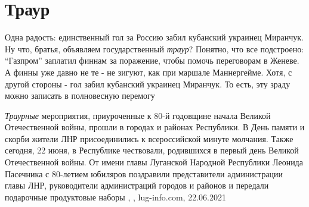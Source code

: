  
 
 
 
 
\chapter{Траур}
\label{sec:slova.traur}

Одна радость: единственный гол за Россию забил кубанский украинец Миранчук.  Ну
что, братья, объявляем государственный \emph{траур}?  Понятно, что все
подстроено: \enquote{Газпром} заплатил финнам за поражение, чтобы помочь
переговорам в Женеве. А финны уже давно не те - не зигуют, как при маршале
Маннергейме.  Хотя, с другой стороны - гол забил кубанский украинец Миранчук.
То есть, эту зраду можно записать в полновесную перемогу
  


\emph{Траурные} мероприятия, приуроченные к 80-й годовщине начала Великой
Отечественной войны, прошли в городах и районах Республики.  В День памяти и
скорби жители ЛНР присоединились к всероссийской минуте молчания.  Также
сегодня, 22 июня, в Республике чествовали, родившихся в первый день Великой
Отечественной войны. От имени главы Луганской Народной Республики Леонида
Пасечника с 80-летием юбиляров поздравили представители администрации главы
ЛНР, руководители администраций городов и районов и передали подарочные
продуктовые наборы
, 
, lug-info.com, 22.06.2021

